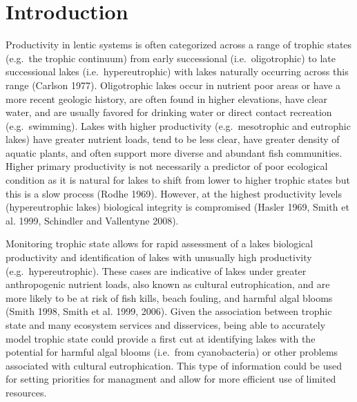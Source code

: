 \documentclass[11pt,]{article}
\begin{document}
\doublespace

\section{Introduction}\label{introduction}

Productivity in lentic systems is often categorized across a range of
trophic states (e.g.~the trophic continuum) from early successional
(i.e.~oligotrophic) to late successional lakes (i.e.~hypereutrophic)
with lakes naturally occurring across this range (Carlson 1977).
Oligotrophic lakes occur in nutrient poor areas or have a more recent
geologic history, are often found in higher elevations, have clear
water, and are usually favored for drinking water or direct contact
recreation (e.g.~swimming). Lakes with higher productivity
(e.g.~mesotrophic and eutrophic lakes) have greater nutrient loads, tend
to be less clear, have greater density of aquatic plants, and often
support more diverse and abundant fish communities. Higher primary
productivity is not necessarily a predictor of poor ecological condition
as it is natural for lakes to shift from lower to higher trophic states
but this is a slow process (Rodhe 1969). However, at the highest
productivity levels (hypereutrophic lakes) biological integrity is
compromised (Hasler 1969, Smith et al. 1999, Schindler and Vallentyne
2008).

Monitoring trophic state allows for rapid assessment of a lakes
biological productivity and identification of lakes with unusually high
productivity (e.g.~hypereutrophic). These cases are indicative of lakes
under greater anthropogenic nutrient loads, also known as cultural
eutrophication, and are more likely to be at risk of fish kills, beach
fouling, and harmful algal blooms (Smith 1998, Smith et al. 1999, 2006).
Given the association between trophic state and many ecosystem services
and disservices, being able to accurately model trophic state could
provide a first cut at identifying lakes with the potential for harmful
algal blooms (i.e.~from cyanobacteria) or other problems associated with
cultural eutrophication. This type of information could be used for
setting priorities for managment and allow for more efficient use of
limited resources.
\end{document}
